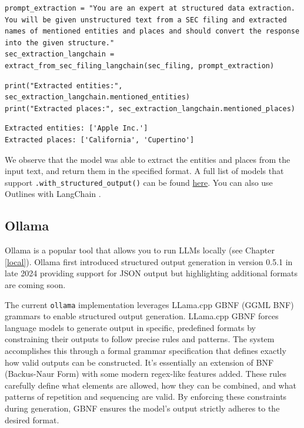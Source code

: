 \begin{verbatim}
prompt_extraction = "You are an expert at structured data extraction. You will be given unstructured text from a SEC filing and extracted names of mentioned entities and places and should convert the response into the given structure."
sec_extraction_langchain = extract_from_sec_filing_langchain(sec_filing, prompt_extraction)
\end{verbatim}

\begin{verbatim}
print("Extracted entities:", sec_extraction_langchain.mentioned_entities)
print("Extracted places:", sec_extraction_langchain.mentioned_places)
\end{verbatim}

\begin{verbatim}
Extracted entities: ['Apple Inc.']
Extracted places: ['California', 'Cupertino']
\end{verbatim}

We observe that the model was able to extract the entities and places from the input text, and return them in the specified format. A full list of models that support \texttt{.with\_structured\_output()} can be found \href{https://python.langchain.com/docs/integrations/chat/#featured-providers}{here}. You can also use Outlines with LangChain \cite{langchain2024outlines}.
\subsection{Ollama}

Ollama is a popular tool that allows you to run LLMs locally (see Chapter \ref{local}). Ollama first introduced structured output generation in version 0.5.1 in late 2024 providing support for JSON output but highlighting additional formats are coming soon.

The current \texttt{ollama} implementation leverages LLama.cpp GBNF (GGML BNF) grammars \cite{llama_cpp_grammars} to enable structured output generation. LLama.cpp GBNF forces language models to generate output in specific, predefined formats by constraining their outputs to follow precise rules and patterns. The system accomplishes this through a formal grammar specification that defines exactly how valid outputs can be constructed. It's essentially an extension of BNF (Backus-Naur Form) \cite{backus_naur_form} with some modern regex-like features added. These rules carefully define what elements are allowed, how they can be combined, and what patterns of repetition and sequencing are valid. By enforcing these constraints during generation, GBNF ensures the model's output strictly adheres to the desired format.

